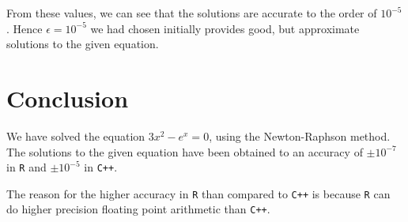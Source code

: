 \documentclass[10pt]{article}
\begin{document}
From these values, we can see that the solutions are accurate to the order of $10^{-5}$. Hence $ \epsilon = 10^{-5}$ we had chosen initially provides good, but approximate solutions to the given equation.
\section{Conclusion}

We have solved the equation $3x^2 - e^x = 0$, using the Newton-Raphson method. The solutions to the given equation have been obtained to an accuracy of $\pm 10^{-7}$ in \texttt{R} and $\pm 10^{-5}$ in \texttt{C++}.\medskip

The reason for the higher accuracy in \texttt{R} than compared to \texttt{C++} is because \texttt{R} can do higher precision floating point arithmetic than \texttt{C++}.
\end{document}
